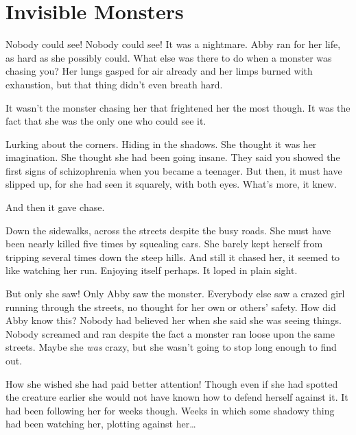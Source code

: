 \chapter{Invisible Monsters}




Nobody could see! Nobody could see! It was a nightmare. Abby ran
for her life, as hard as she possibly could. What else was there to
do when a monster was chasing you? Her lungs gasped for air already
and her limps burned with exhaustion, but that thing didn't even
breath hard.



It wasn't the monster chasing her that frightened her the most
though. It was the fact that she was the only one who could see
it.



Lurking about the corners. Hiding in the shadows. She thought it
was her imagination. She thought she had been going insane. They
said you showed the first signs of schi\-zo\-phre\-nia when you became a
teenager. But then, it must have slipped up, for she had seen it
squarely, with both eyes. What's more, it knew.



And then it gave chase.



Down the sidewalks, across the streets despite the busy roads. She
must have been nearly killed five times by squealing cars. She
barely kept herself from tripping several times down the steep
hills. And still it chased her, it seemed to like watching her run.
Enjoying itself perhaps. It loped in plain sight.



But only she saw! Only Abby saw the monster. Everybody else saw a
crazed girl running through the streets, no thought for her own or
others' safety. How did Abby know this? Nobody had believed her
when she said she was seeing things. Nobody screamed and ran
despite the fact a monster ran loose upon the same streets. Maybe
she {\em was} crazy, but she wasn't going to stop long enough to
find out.



How she wished she had paid better attention! Though even if
she had spotted the creature earlier she would not have known how
to defend herself against it. It had been following her for weeks
though. Weeks in which some shadowy thing had been watching her,
plotting against her{\ldots}



